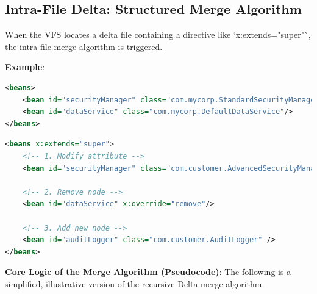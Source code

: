 \documentclass[11pt]{article}
\begin{document}
\subsection{Intra-File Delta: Structured Merge Algorithm}
When the VFS locates a delta file containing a directive like `x:extends="super"`, the intra-file merge algorithm is triggered.

\textbf{Example}:
\begin{lstlisting}[language=XML, caption={Base Definition (`/beans/core.xml`)}]
<beans>
    <bean id="securityManager" class="com.mycorp.StandardSecurityManager"/>
    <bean id="dataService" class="com.mycorp.DefaultDataService"/>
</beans>
\end{lstlisting}

\begin{lstlisting}[language=XML, caption={Customer A's Delta Definition (`/\_delta/customer-a/beans/core.xml`)}]
<beans x:extends="super">
    <!-- 1. Modify attribute -->
    <bean id="securityManager" class="com.customer.AdvancedSecurityManager"/>

    <!-- 2. Remove node -->
    <bean id="dataService" x:override="remove"/>
    
    <!-- 3. Add new node -->
    <bean id="auditLogger" class="com.customer.AuditLogger" />
</beans>
\end{lstlisting}

\textbf{Core Logic of the Merge Algorithm (Pseudocode)}:
The following is a simplified, illustrative version of the recursive Delta merge algorithm.
\end{document}
